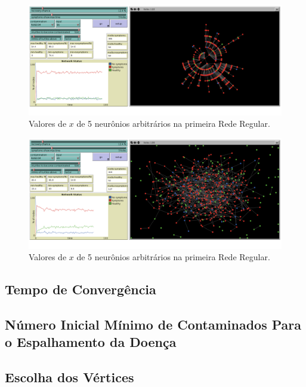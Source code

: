 \documentclass{article}
\begin{document}
\begin{figure}[H]
  \centerline{\includegraphics[width=\linewidth]{BA_consenso.png}}
  \caption{Valores de $x$ de 5 neurônios arbitrários na primeira Rede Regular.}
  \label{fig:boat1}
\end{figure}

\begin{figure}[H]
  \centerline{\includegraphics[width=\linewidth]{ER_consenso.png}}
  \caption{Valores de $x$ de 5 neurônios arbitrários na primeira Rede Regular.}
  \label{fig:boat1}
\end{figure}


\subsection{Tempo de Convergência}

\subsection{Número Inicial Mínimo de Contaminados Para o Espalhamento da Doença}

\subsection{Escolha dos Vértices}







\clearpage
 
\end{document}
